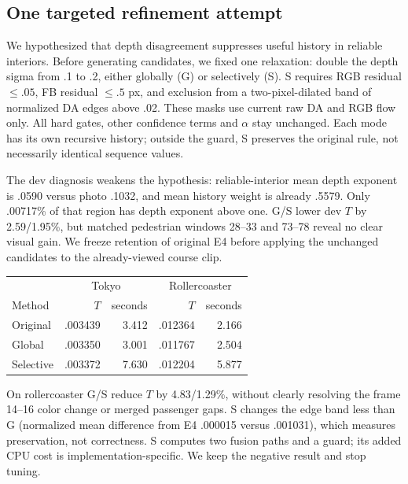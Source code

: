 \documentclass[10pt,twocolumn,letterpaper]{article}
\begin{document}
\subsection{One targeted refinement attempt}
We hypothesized that depth disagreement suppresses useful history in reliable interiors. Before generating candidates, we fixed one relaxation: double the depth sigma from .1 to .2, either globally (G) or selectively (S). S requires RGB residual $\le .05$, FB residual $\le .5$ px, and exclusion from a two-pixel-dilated band of normalized DA edges above .02. These masks use current raw DA and RGB flow only. All hard gates, other confidence terms and $\alpha$ stay unchanged. Each mode has its own recursive history; outside the guard, S preserves the original rule, not necessarily identical sequence values.

The dev diagnosis weakens the hypothesis: reliable-interior mean depth exponent is .0590 versus photo .1032, and mean history weight is already .5579. Only .00717\% of that region has depth exponent above one. G/S lower dev $T$ by 2.59/1.95\%, but matched pedestrian windows 28--33 and 73--78 reveal no clear visual gain. We freeze retention of original E4 before applying the unchanged candidates to the already-viewed course clip.

\begin{center}\begin{minipage}{\linewidth}\centering
{}
\label{tab:refinement}
\small
\begin{tabular}{lrrrr}
\toprule
&\multicolumn{2}{c}{Tokyo}&\multicolumn{2}{c}{Rollercoaster}\\
Method&$T$&seconds&$T$&seconds\\
\midrule
Original&.003439&3.412&.012364&2.166\\
Global&.003350&3.001&.011767&2.504\\
Selective&.003372&7.630&.012204&5.877\\
\bottomrule
\end{tabular}
\end{minipage}\end{center}

On rollercoaster G/S reduce $T$ by 4.83/1.29\%, without clearly resolving the frame 14--16 color change or merged passenger gaps. S changes the edge band less than G (normalized mean difference from E4 .000015 versus .001031), which measures preservation, not correctness. S computes two fusion paths and a guard; its added CPU cost is implementation-specific. We keep the negative result and stop tuning.
\end{document}

